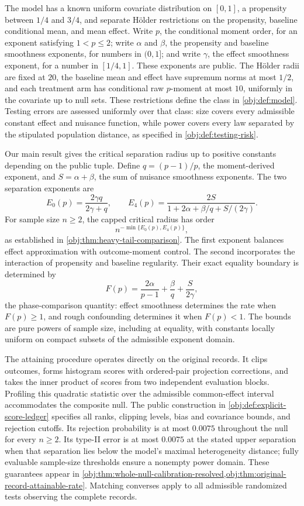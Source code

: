 \documentclass[11pt]{article}
\begin{document}
The model has a known uniform covariate distribution on \([0,1]\), a propensity between \(1/4\) and \(3/4\), and separate Hölder restrictions on the propensity, baseline conditional mean, and mean effect. Write \(p\), the conditional moment order, for an exponent satisfying \(1<p\le2\); write \(\alpha\) and \(\beta\), the propensity and baseline smoothness exponents, for numbers in \((0,1]\); and write \(\gamma\), the effect smoothness exponent, for a number in \([1/4,1]\). These exponents are public. The Hölder radii are fixed at \(20\), the baseline mean and effect have supremum norms at most \(1/2\), and each treatment arm has conditional raw \(p\)-moment at most \(10\), uniformly in the covariate up to null sets. These restrictions define the class in \cref{obj:def:model}. Testing errors are assessed uniformly over that class: size covers every admissible constant effect and nuisance function, while power covers every law separated by the stipulated population distance, as specified in \cref{obj:def:testing-risk}.

Our main result gives the critical separation radius up to positive constants depending on the public tuple. Define \(q=(p-1)/p\), the moment-derived exponent, and \(S=\alpha+\beta\), the sum of nuisance smoothness exponents. The two separation exponents are
\[
E_0(p)=\frac{2\gamma q}{2\gamma+q},
\qquad
E_4(p)=
\frac{2S}{1+2\alpha+\beta/q+S/(2\gamma)}.
\]
For sample size \(n\ge2\), the capped critical radius has order
\[
n^{-\min\{E_0(p),E_4(p)\}},
\]
as established in \cref{obj:thm:heavy-tail-comparison}. The first exponent balances effect approximation with outcome-moment control. The second incorporates the interaction of propensity and baseline regularity. Their exact equality boundary is determined by
\[
F(p)=
\frac{2\alpha}{p-1}
+\frac{\beta}{q}
+\frac{S}{2\gamma},
\]
the phase-comparison quantity: effect smoothness determines the rate when \(F(p)\ge1\), and rough confounding determines it when \(F(p)<1\). The bounds are pure powers of sample size, including at equality, with constants locally uniform on compact subsets of the admissible exponent domain.

The attaining procedure operates directly on the original records. It clips outcomes, forms histogram scores with ordered-pair projection corrections, and takes the inner product of scores from two independent evaluation blocks. Profiling this quadratic statistic over the admissible common-effect interval accommodates the composite null. The public construction in \cref{obj:def:explicit-score-ledger} specifies all ranks, clipping levels, bias and covariance bounds, and rejection cutoffs. Its rejection probability is at most \(0.0075\) throughout the null for every \(n\ge2\). Its type-II error is at most \(0.0075\) at the stated upper separation when that separation lies below the model's maximal heterogeneity distance; fully evaluable sample-size thresholds ensure a nonempty power domain. These guarantees appear in \cref{obj:thm:whole-null-calibration-resolved,obj:thm:original-record-attainable-rate}. Matching converses apply to all admissible randomized tests observing the complete records.
\end{document}
